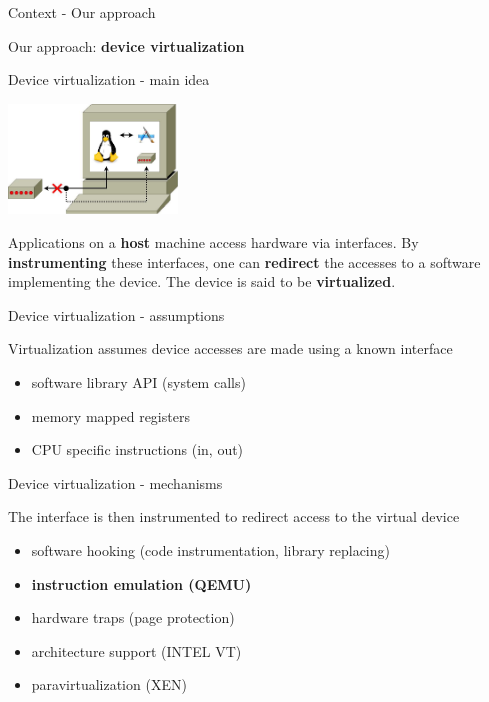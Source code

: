 \documentclass{beamer}
\begin{document}
\begin{frame}{Context - Our approach}
  \begin{center} Our approach: \textbf{device virtualization} \end{center}
\end{frame}

\begin{frame}{Device virtualization - main idea}
  \begin{center}
    \includegraphics[width=45mm]{pic/dv_redirect/main.jpeg}
  \end{center}
  \begin{small}
    Applications on a \textbf{host} machine access hardware via interfaces. By
    \textbf{instrumenting} these interfaces, one can \textbf{redirect} the accesses
    to a software implementing the device. The device is said to be
    \textbf{virtualized}.
  \end{small}
\end{frame}

\begin{frame}{Device virtualization - assumptions}
  \begin{small}
  Virtualization assumes device accesses are made using a known interface
  \begin{itemize}
  \item software library API (system calls)
  \item memory mapped registers
  \item CPU specific instructions (in, out)
  \end{itemize}
  \end{small}
\end{frame}

\begin{frame}{Device virtualization - mechanisms}
  \begin{small}
  The interface is then instrumented to redirect access to the virtual device
  \begin{itemize}
  \item software hooking (code instrumentation, library replacing)
  \item \textbf{instruction emulation (QEMU)}
  \item hardware traps (page protection)
  \item architecture support (INTEL VT)
  \item paravirtualization (XEN)
  \end{itemize}
  \end{small}
\end{frame}
\end{document}
